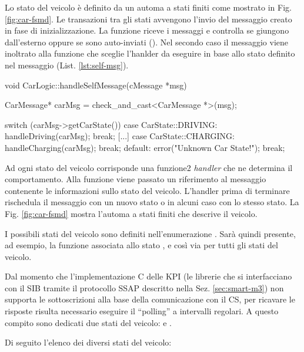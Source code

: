 Lo stato del veicolo è definito da un automa a stati finiti come mostrato in Fig. \ref{fig:car-fsmd}. Le transazioni tra gli stati avvengono l'invio del messaggio creato in fase di inizializzazione. La funzione  riceve i messaggi e controlla se giungono dall'esterno oppure se sono auto-inviati (). Nel secondo caso il messaggio viene inoltrato alla funzione  che sceglie l'hanlder da eseguire in base allo stato definito nel messaggio (List. \ref{lst:self-msg}).

\begin{cpp}[caption={Funzione di scelta dello stato}, label={lst:self-msg}]
void CarLogic::handleSelfMessage(cMessage *msg) {
	CarMessage* carMsg = check_and_cast<CarMessage *>(msg);
	
	switch (carMsg->getCarState()) {
		case CarState::DRIVING:
			handleDriving(carMsg);
			break;
		[...]
		case CarState::CHARGING:
			handleCharging(carMsg);
			break;
		default:
			error("Unknown Car State!");
			break;
	}	
}
\end{cpp}

Ad ogni stato del veicolo corrisponde una funzione2 \emph{handler} che ne determina il comportamento. Alla funzione viene passato un riferimento al messaggio contenente le informazioni sullo stato del veicolo. L'handler prima di terminare rischedula il messaggio con un nuovo stato o in alcuni caso con lo stesso stato. La Fig. \ref{fig:car-fsmd} mostra l'automa a stati finiti che descrive il veicolo. 

I possibili stati del veicolo sono definiti nell'enumerazione . Sarà quindi presente, ad esempio, la funzione  associata allo stato , e così via per tutti gli stati del veicolo.

Dal momento che l'implementazione C delle KPI (le librerie che si interfacciano con il SIB tramite il protocollo SSAP descritto nella Sez. \ref{sec:smart-m3}) non supporta le sottoscrizioni alla base della comunicazione con il CS, per ricavare le risposte risulta necessario eseguire il ``polling'' a intervalli regolari. A questo compito sono dedicati due stati del veicolo:  e .

Di seguito l'elenco dei diversi stati del veicolo:

